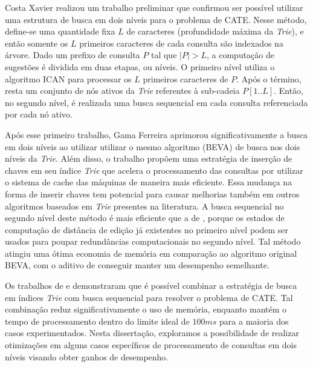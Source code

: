 Costa Xavier \citep{xavier2019} realizou um trabalho preliminar que confirmou ser possível utilizar uma estrutura de busca em dois níveis para o problema de CATE. Nesse método, define-se uma quantidade fixa $L$ de caracteres (profundidade máxima da \textit{Trie}), e então somente os $L$ primeiros caracteres de cada consulta são indexados na árvore. Dado um prefixo de consulta $P$ tal que $|P| > L$, a computação de sugestões é dividida em duas etapas, ou níveis. O primeiro nível utiliza o algoritmo ICAN \citep{ji2009efficient} para processar os $L$ primeiros caracteres de $P$. Após o término, resta um conjunto de nós ativos da \textit{Trie} referentes à sub-cadeia  $P[1..L]$. Então, no segundo nível, é realizada uma busca sequencial em cada consulta referenciada por cada nó ativo. 

Após esse primeiro trabalho, Gama Ferreira \citep{berg2020} aprimorou significativamente a busca em dois níveis ao utilizar utilizar o mesmo algoritmo (BEVA) de busca nos dois níveis da \textit{Trie}. Além disso, o trabalho propõem uma estratégia de inserção de chaves em seu índice \textit{Trie} que acelera o processamento das consultas por utilizar o sistema de cache das máquinas de maneira mais eficiente. Essa mudança na forma de inserir chaves tem potencial para causar melhorias também em outros algoritmos baseados em \textit{Trie} presentes na literatura. A busca sequencial no segundo nível deste método é mais eficiente que a de \cite{xavier2019}, porque os estados de computação de distância de edição já existentes no primeiro nível podem ser usados para poupar redundâncias computacionais no segundo nível. Tal método atingiu uma ótima economia de memória em comparação ao algoritmo original BEVA, com o aditivo de conseguir manter um desempenho semelhante. 

Os trabalhos de \cite{xavier2019} e \cite{berg2020} demonstraram que é possível combinar a estratégia de busca em índices \textit{Trie} com busca sequencial para resolver o problema de CATE. Tal combinação reduz significativamente o uso de memória, enquanto mantém o tempo de processamento dentro do limite ideal de $100ms$ para a maioria dos casos experimentados. Nesta dissertação, exploramos a possibilidade de realizar otimizações em alguns casos específicos de processamento de consultas em dois níveis visando obter ganhos de desempenho.
